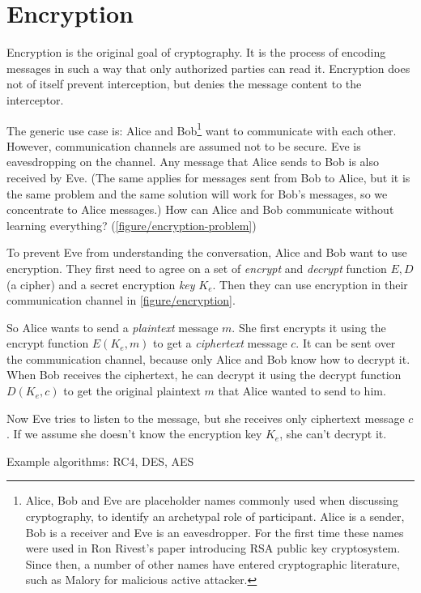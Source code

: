 \section{Encryption}
\label{toc/encryption}




Encryption is the original goal of cryptography. It is the process of encoding messages in such a way that only authorized parties can read it. Encryption does not of itself prevent interception, but denies the message content to the interceptor.

The generic use case is: Alice and Bob\footnote{Alice, Bob and Eve are placeholder names commonly used when discussing cryptography, to identify an archetypal role of participant. Alice is a sender, Bob is a receiver and Eve is an eavesdropper. For the first time these names were used in Ron Rivest's paper introducing RSA public key cryptosystem. \cite{rsa} Since then, a number of other names have entered cryptographic literature, such as Malory for malicious active attacker.} want to communicate with each other. However, communication channels are assumed not to be secure. Eve is eavesdropping on the channel. Any message that Alice sends to Bob is also received by Eve. (The same applies for messages sent from Bob to Alice, but it is the same problem and the same solution will work for Bob's messages, so we concentrate to Alice messages.) How can Alice and Bob communicate without learning everything? (\autoref{figure/encryption-problem}) \cite{ferguson2010cryptography}

To prevent Eve from understanding the conversation, Alice and Bob want to use encryption. They first need to agree on a set of \textit{encrypt} and \textit{decrypt} function $E, D$ (a cipher) and a secret encryption \textit{key} $K_e$. Then they can use encryption in their communication channel in \autoref{figure/encryption}.

So Alice wants to send a \textit{plaintext} message $m$. She first encrypts it using the encrypt function $E(K_e, m)$ to get a \textit{ciphertext} message $c$. It can be sent over the communication channel, because only Alice and Bob know how to decrypt it. When Bob receives the ciphertext, he can decrypt it using the decrypt function $D(K_e, c)$ to get the original plaintext $m$ that Alice wanted to send to him.

Now Eve tries to listen to the message, but she receives only ciphertext message $c$. If we assume she doesn't know the encryption key $K_e$, she can't decrypt it.

Example algorithms: RC4, DES, AES
